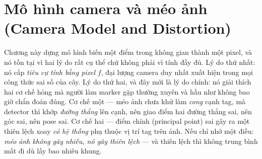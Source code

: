 \documentclass[../../marker.tex]{subfiles}
\begin{document}
\chapter{Mô hình camera và méo ảnh (Camera Model and Distortion)}

\begin{tomtat}
Chương này dựng mô hình biến một điểm trong không gian thành một pixel, và nó tồn tại vì hai lý do rất cụ thể chứ không phải vì tính đầy đủ. Lý do thứ nhất: nó cấp \emph{tiêu cự tính bằng pixel} \(f\), đại lượng camera duy nhất xuất hiện trong mọi công thức sai số của cây. Lý do thứ hai, và đây mới là lý do chính: nó giải thích hai cơ chế hỏng mà người làm marker gặp thường xuyên và hầu như không bao giờ chẩn đoán đúng. Cơ chế một --- méo ảnh chưa khử làm \emph{cong} cạnh tag, mà detector thì khớp \emph{đường thẳng} lên cạnh, nên giao điểm hai đường thẳng sai, nên góc sai, nên pose sai. Cơ chế hai --- điểm chính (principal point) sai gây ra một thiên lệch xoay \emph{có hệ thống} phụ thuộc vị trí tag trên ảnh. Nếu chỉ nhớ một điều: \emph{méo ảnh không gây nhiễu, nó gây thiên lệch} --- và thiên lệch thì không trung bình mất đi dù lấy bao nhiêu khung.
\end{tomtat}
\end{document}
